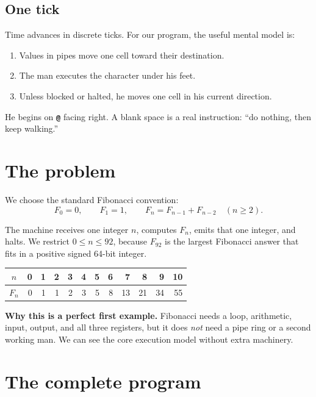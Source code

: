\documentclass[11pt,a4paper]{article}
\newcommand{\op}[1]{\texttt{\bfseries #1}}
\newcommand{\Fib}[1]{F_{#1}}
\begin{document}
\subsection{One tick}

Time advances in discrete ticks. For our program, the useful mental model is:

\begin{enumerate}
  \item Values in pipes move one cell toward their destination.
  \item The man executes the character under his feet.
  \item Unless blocked or halted, he moves one cell in his current direction.
\end{enumerate}

He begins on \op{@} facing right. A blank space is a real instruction:
``do nothing, then keep walking.''

\section{The problem}

We choose the standard Fibonacci convention:
\[
  \Fib{0}=0,\qquad
  \Fib{1}=1,\qquad
  \Fib{n}=\Fib{n-1}+\Fib{n-2}\quad(n\ge2).
\]

The machine receives one integer \(n\), computes \(\Fib{n}\), emits that one
integer, and halts. We restrict \(0\le n\le92\), because \(\Fib{92}\) is the
largest Fibonacci answer that fits in a positive signed 64-bit integer.

\begin{center}
\begin{tabular}{c|rrrrrrrrrrr}
  \(n\) & 0&1&2&3&4&5&6&7&8&9&10\\
  \midrule
  \(\Fib{n}\) & 0&1&1&2&3&5&8&13&21&34&55
\end{tabular}
\end{center}

\begin{bluebox}
  \textbf{Why this is a perfect first example.}
  Fibonacci needs a loop, arithmetic, input, output, and all three registers,
  but it does \emph{not} need a pipe ring or a second working man. We can see
  the core execution model without extra machinery.
\end{bluebox}

\section{The complete program}
\end{document}
